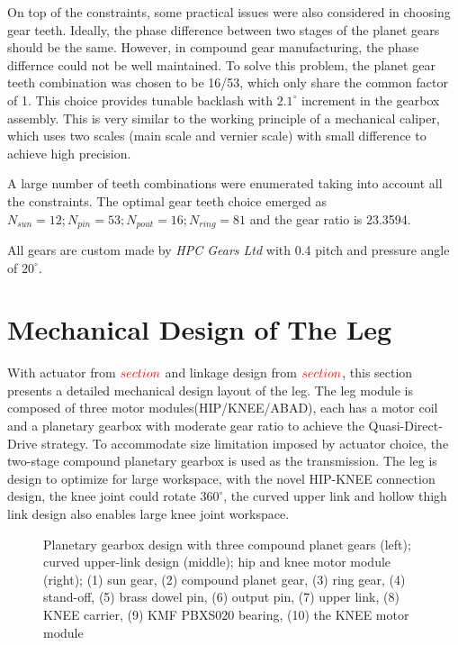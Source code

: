 On top of the constraints, some practical issues were also considered in choosing gear teeth. Ideally, the phase difference between two stages of the planet gears should be the same. However, in compound gear manufacturing, the phase differnce could not be well maintained. To solve this problem, the planet gear teeth combination was chosen to be 16/53, which only share the common factor of 1. This choice provides tunable backlash with $2.1^{\circ}$ increment in the gearbox assembly. This is very similar to the working principle of a mechanical caliper, which uses two scales (main scale and vernier scale) with small difference to achieve high precision.

A large number of teeth combinations were enumerated taking into account all the constraints. The optimal gear teeth choice emerged as $N_{sun} = 12; N_{pin} = 53; N_{pout} = 16; N_{ring} = 81$ and the gear ratio is 23.3594.

All gears are custom made by \textit{HPC Gears Ltd} with 0.4 pitch and pressure angle of $20^{\circ}$.



\section{\textbf{Mechanical Design of The Leg}}
\label{sec:LegDesign}

With actuator from $\color{red}section$ and linkage design from $\color{red}section$, this section presents a detailed mechanical design layout of the leg. The leg module is composed of three motor modules(HIP/KNEE/ABAD), each has a motor coil and a planetary gearbox with moderate gear ratio to achieve the Quasi-Direct-Drive\cite{20162016} strategy. To accommodate size limitation imposed by actuator choice, the two-stage compound planetary gearbox is used as the transmission. The leg is design to optimize for large workspace, with the novel HIP-KNEE connection design, the knee joint could rotate $360^{\circ}$, the curved upper link and hollow thigh link design also enables large knee joint workspace.
  
\begin{figure}
	\centering
	\caption{Planetary gearbox design with three compound planet gears (left); curved upper-link design (middle); hip and knee motor module (right); (1) sun gear, (2) compound planet gear, (3) ring gear, (4) stand-off, (5) brass dowel pin, (6) output pin, (7) upper link, (8) KNEE carrier, (9) KMF PBXS020 bearing, (10) the KNEE motor module}
	\label{fig:gearbox}
\end{figure}




